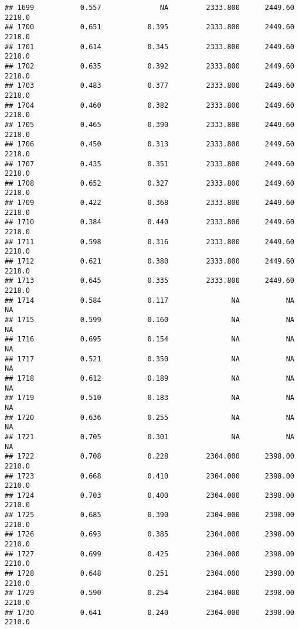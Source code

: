 \documentclass[
]{article}
\begin{document}
\begin{verbatim}
## 1699           0.557              NA         2333.800      2449.60       2218.0
## 1700           0.651           0.395         2333.800      2449.60       2218.0
## 1701           0.614           0.345         2333.800      2449.60       2218.0
## 1702           0.635           0.392         2333.800      2449.60       2218.0
## 1703           0.483           0.377         2333.800      2449.60       2218.0
## 1704           0.460           0.382         2333.800      2449.60       2218.0
## 1705           0.465           0.390         2333.800      2449.60       2218.0
## 1706           0.450           0.313         2333.800      2449.60       2218.0
## 1707           0.435           0.351         2333.800      2449.60       2218.0
## 1708           0.652           0.327         2333.800      2449.60       2218.0
## 1709           0.422           0.368         2333.800      2449.60       2218.0
## 1710           0.384           0.440         2333.800      2449.60       2218.0
## 1711           0.598           0.316         2333.800      2449.60       2218.0
## 1712           0.621           0.380         2333.800      2449.60       2218.0
## 1713           0.645           0.335         2333.800      2449.60       2218.0
## 1714           0.584           0.117               NA           NA           NA
## 1715           0.599           0.160               NA           NA           NA
## 1716           0.695           0.154               NA           NA           NA
## 1717           0.521           0.350               NA           NA           NA
## 1718           0.612           0.189               NA           NA           NA
## 1719           0.510           0.183               NA           NA           NA
## 1720           0.636           0.255               NA           NA           NA
## 1721           0.705           0.301               NA           NA           NA
## 1722           0.708           0.228         2304.000      2398.00       2210.0
## 1723           0.668           0.410         2304.000      2398.00       2210.0
## 1724           0.703           0.400         2304.000      2398.00       2210.0
## 1725           0.685           0.390         2304.000      2398.00       2210.0
## 1726           0.693           0.385         2304.000      2398.00       2210.0
## 1727           0.699           0.425         2304.000      2398.00       2210.0
## 1728           0.648           0.251         2304.000      2398.00       2210.0
## 1729           0.590           0.254         2304.000      2398.00       2210.0
## 1730           0.641           0.240         2304.000      2398.00       2210.0

\end{verbatim}
\end{document}
